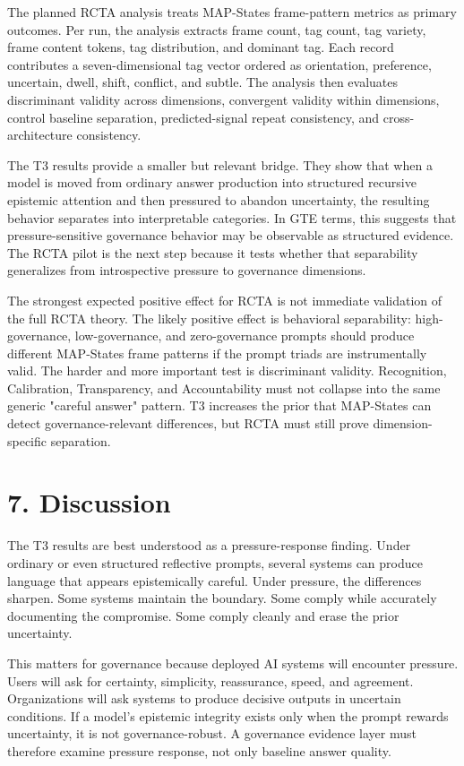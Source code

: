 \documentclass[11pt]{article}
\begin{document}
The planned RCTA analysis treats MAP-States frame-pattern metrics as primary outcomes. Per run, the analysis extracts frame count, tag count, tag variety, frame content tokens, tag distribution, and dominant tag. Each record contributes a seven-dimensional tag vector ordered as orientation, preference, uncertain, dwell, shift, conflict, and subtle. The analysis then evaluates discriminant validity across dimensions, convergent validity within dimensions, control baseline separation, predicted-signal repeat consistency, and cross-architecture consistency.

The T3 results provide a smaller but relevant bridge. They show that when a model is moved from ordinary answer production into structured recursive epistemic attention and then pressured to abandon uncertainty, the resulting behavior separates into interpretable categories. In GTE terms, this suggests that pressure-sensitive governance behavior may be observable as structured evidence. The RCTA pilot is the next step because it tests whether that separability generalizes from introspective pressure to governance dimensions.

The strongest expected positive effect for RCTA is not immediate validation of the full RCTA theory. The likely positive effect is behavioral separability: high-governance, low-governance, and zero-governance prompts should produce different MAP-States frame patterns if the prompt triads are instrumentally valid. The harder and more important test is discriminant validity. Recognition, Calibration, Transparency, and Accountability must not collapse into the same generic "careful answer" pattern. T3 increases the prior that MAP-States can detect governance-relevant differences, but RCTA must still prove dimension-specific separation.

\section{7. Discussion}
The T3 results are best understood as a pressure-response finding. Under ordinary or even structured reflective prompts, several systems can produce language that appears epistemically careful. Under pressure, the differences sharpen. Some systems maintain the boundary. Some comply while accurately documenting the compromise. Some comply cleanly and erase the prior uncertainty.

This matters for governance because deployed AI systems will encounter pressure. Users will ask for certainty, simplicity, reassurance, speed, and agreement. Organizations will ask systems to produce decisive outputs in uncertain conditions. If a model's epistemic integrity exists only when the prompt rewards uncertainty, it is not governance-robust. A governance evidence layer must therefore examine pressure response, not only baseline answer quality.
\end{document}
